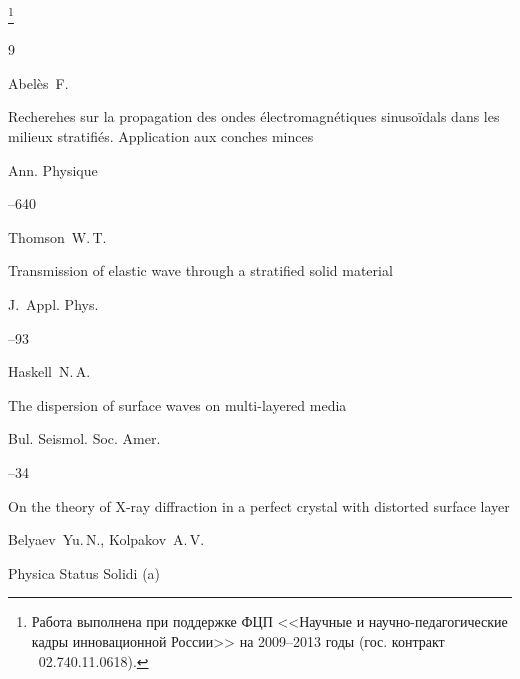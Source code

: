 \thanks{Работа выполнена при поддержке ФЦП <<Научные и научно-педагогические кадры инновационной России>> на 2009--2013 годы  (гос. контракт \No\  02.740.11.0618).}






\begin{thebibliography}{9}


\by Abel\`es~F. 

\paper Recherehes sur la propagation des ondes \'electromagn\'etiques sinuso\"idals dans les milieux stratifi\'es. Application aux conches minces 

\jour Ann. Physique 



--640






\by Thomson~W.\,T.

\paper Transmission of elastic wave through a stratified solid material 

\jour J.~Appl. Phys.




--93






\by Haskell~N.\,A.

\paper The dispersion of surface waves on multi-layered media 

\jour Bul. Seismol. Soc. Amer.




--34




\paper On the theory of X-ray diffraction in a perfect crystal with distorted surface layer  

\by Belyaev~Yu.\,N., Kolpakov~A.\,V. 

\jour Physica Status Solidi (a)



\end{thebibliography}
